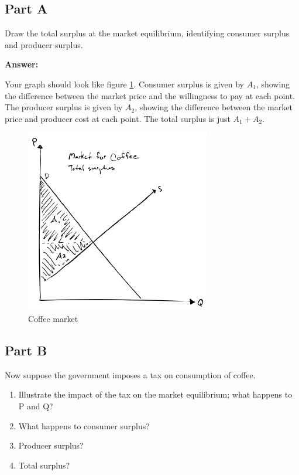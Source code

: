 \documentclass[12pt]{article}
\begin{document}
\subsection*{Part A}
Draw the total surplus at the market equilibrium, identifying consumer surplus and producer surplus.

\vspace{2mm}

\textbf{Answer:}

\vspace{2mm}

Your graph should look like figure \ref{fig:coffee2}. Consumer surplus is given by $A_1$, showing the difference between the market price and the willingness to pay at each point. The producer surplus is given by $A_2$, showing the difference between the market price and producer cost at each point. The total surplus is just $A_1 + A_2$.

\vspace{2mm}

\begin{figure}
    \centering
    \includegraphics[width=.5\textwidth]{../../figs/coffee2.png}
    \caption{Coffee market}
    \label{fig:coffee2}
\end{figure}

\vspace{2mm}

\subsection*{Part B}
Now suppose the government imposes a tax on consumption of coffee.

\vspace{2mm}

\begin{enumerate}
    \item Illustrate the impact of the tax on the market equilibrium; what happens to P and Q?
    \item What happens to consumer surplus?
    \item Producer surplus?
    \item Total surplus?
\end{enumerate}
\end{document}
